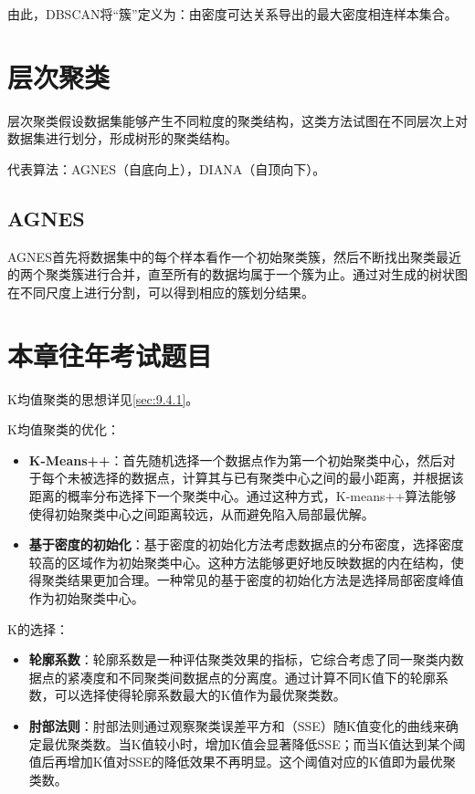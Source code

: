 由此，DBSCAN将“簇”定义为：由密度可达关系导出的最大密度相连样本集合。

\section{层次聚类}\label{sec:9.6}
层次聚类假设数据集能够产生不同粒度的聚类结构，这类方法试图在不同层次上对数据集进行划分，形成树形的聚类结构。

代表算法：AGNES（自底向上），DIANA（自顶向下）。

\subsection{AGNES}
AGNES首先将数据集中的每个样本看作一个初始聚类簇，然后不断找出聚类最近的两个聚类簇进行合并，直至所有的数据均属于一个簇为止。通过对生成的树状图在不同尺度上进行分割，可以得到相应的簇划分结果。

\section{本章往年考试题目}\label{sec:9.7}


K均值聚类的思想详见\ref{sec:9.4.1}。

K均值聚类的优化：
\begin{itemize}
    \item \textbf{K-Means++}：首先随机选择一个数据点作为第一个初始聚类中心，然后对于每个未被选择的数据点，计算其与已有聚类中心之间的最小距离，并根据该距离的概率分布选择下一个聚类中心。通过这种方式，K-means++算法能够使得初始聚类中心之间距离较远，从而避免陷入局部最优解。
    \item \textbf{基于密度的初始化}：基于密度的初始化方法考虑数据点的分布密度，选择密度较高的区域作为初始聚类中心。这种方法能够更好地反映数据的内在结构，使得聚类结果更加合理。一种常见的基于密度的初始化方法是选择局部密度峰值作为初始聚类中心。
\end{itemize}

K的选择：
\begin{itemize}
    \item \textbf{轮廓系数}：轮廓系数是一种评估聚类效果的指标，它综合考虑了同一聚类内数据点的紧凑度和不同聚类间数据点的分离度。通过计算不同K值下的轮廓系数，可以选择使得轮廓系数最大的K值作为最优聚类数。
    \item \textbf{肘部法则}：肘部法则通过观察聚类误差平方和（SSE）随K值变化的曲线来确定最优聚类数。当K值较小时，增加K值会显著降低SSE；而当K值达到某个阈值后再增加K值对SSE的降低效果不再明显。这个阈值对应的K值即为最优聚类数。
\end{itemize}


